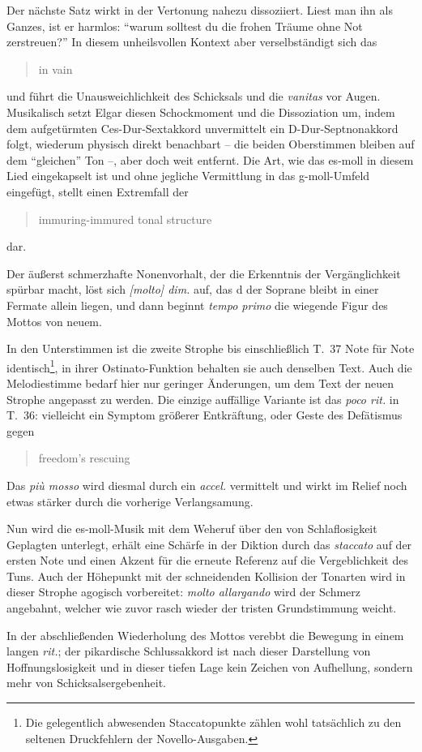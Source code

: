 \documentclass[a4paper,11pt,open=any]{scrbook}
\newcommand{\engquote}[1]{\foreignblockquote{english}{#1}}
\begin{document}
Der nächste Satz wirkt in der Vertonung nahezu dissoziiert.  Liest man
ihn als Ganzes, ist er harmlos: \enquote{warum solltest du die frohen
Träume ohne Not zerstreuen?}  In diesem unheilsvollen Kontext aber
verselbständigt sich das \engquote{in vain} und führt die Unausweichlichkeit
des Schicksals und die \textit{vanitas} vor Augen.  Musikalisch setzt
Elgar diesen Schockmoment und die Dissoziation um, indem dem aufgetürmten
Ces-Dur-Sextakkord unvermittelt ein D-Dur-Septnonakkord folgt, wiederum
physisch direkt benachbart – die beiden Oberstimmen bleiben auf dem
\enquote{gleichen} Ton –, aber doch weit entfernt.  Die Art, wie das
es-moll in diesem Lied eingekapselt ist und ohne jegliche Vermittlung
in das g-moll-Umfeld eingefügt, stellt einen Extremfall der
\engquote{immuring-immured tonal structure} dar.

Der äußerst schmerzhafte Nonenvorhalt, der die Erkenntnis der Vergänglichkeit
spürbar macht, löst sich \textit{[molto] dim.} auf, das \textsf{d} der
Soprane bleibt in einer Fermate allein liegen, und dann beginnt \textit{tempo
primo} die wiegende Figur des Mottos von neuem.

In den Unterstimmen ist die zweite Strophe bis einschließlich T.~37 Note
für Note identisch\footnote{Die gelegentlich abwesenden Staccatopunkte
zählen wohl tatsächlich zu den seltenen Druckfehlern der Novello-Ausgaben.},
in ihrer Ostinato-Funktion behalten sie auch denselben Text.  Auch die
Melodiestimme bedarf hier nur geringer Änderungen, um dem Text der neuen
Strophe angepasst zu werden.  Die einzige auffällige Variante ist das
\textit{poco rit.} in T.~36: vielleicht ein Symptom größerer Entkräftung,
oder Geste des Defätismus gegen \engquote{freedom’s rescuing}.  Das
\textit{più mosso} wird diesmal durch ein \textit{accel.} vermittelt
und wirkt im Relief noch etwas stärker durch die vorherige Verlangsamung.

Nun wird die es-moll-Musik mit dem Weheruf über den von Schlaflosigkeit
Geplagten unterlegt, erhält eine Schärfe in der Diktion durch das
\textit{staccato} auf der ersten Note und einen Akzent für die erneute
Referenz auf die Vergeblichkeit des Tuns.  Auch der Höhepunkt mit der
schneidenden Kollision der Tonarten wird in dieser Strophe agogisch
vorbereitet: \textit{molto allargando} wird der Schmerz angebahnt,
welcher wie zuvor rasch wieder der tristen Grundstimmung weicht.

In der abschließenden Wiederholung des Mottos verebbt die Bewegung in
einem langen \textit{rit.}; der pikardische Schlussakkord ist nach dieser
Darstellung von Hoffnungslosigkeit und in dieser tiefen Lage kein Zeichen
von Aufhellung, sondern mehr von Schicksalsergebenheit.
\end{document}
